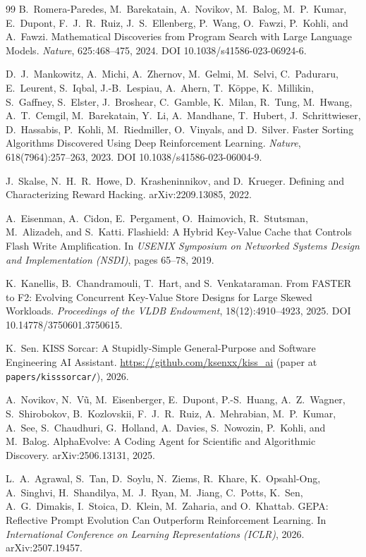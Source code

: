 \documentclass{article}
\begin{document}
\begin{thebibliography}{99}
 B.~Romera-Paredes, M.~Barekatain, A.~Novikov, M.~Balog, M.~P.~Kumar, E.~Dupont, F.~J.~R.~Ruiz, J.~S.~Ellenberg, P.~Wang, O.~Fawzi, P.~Kohli, and A.~Fawzi.
Mathematical Discoveries from Program Search with Large Language Models.
\emph{Nature}, 625:468--475, 2024. DOI 10.1038/s41586-023-06924-6.

 D.~J.~Mankowitz, A.~Michi, A.~Zhernov, M.~Gelmi, M.~Selvi, C.~Paduraru, E.~Leurent, S.~Iqbal, J.-B.~Lespiau, A.~Ahern, T.~K\"oppe, K.~Millikin, S.~Gaffney, S.~Elster, J.~Broshear, C.~Gamble, K.~Milan, R.~Tung, M.~Hwang, A.~T.~Cemgil, M.~Barekatain, Y.~Li, A.~Mandhane, T.~Hubert, J.~Schrittwieser, D.~Hassabis, P.~Kohli, M.~Riedmiller, O.~Vinyals, and D.~Silver.
Faster Sorting Algorithms Discovered Using Deep Reinforcement Learning.
\emph{Nature}, 618(7964):257--263, 2023. DOI 10.1038/s41586-023-06004-9.

 J.~Skalse, N.~H.~R.~Howe, D.~Krasheninnikov, and D.~Krueger.
Defining and Characterizing Reward Hacking.
arXiv:2209.13085, 2022.

 A.~Eisenman, A.~Cidon, E.~Pergament, O.~Haimovich, R.~Stutsman, M.~Alizadeh, and S.~Katti.
Flashield: A Hybrid Key-Value Cache that Controls Flash Write Amplification.
In \emph{USENIX Symposium on Networked Systems Design and Implementation (NSDI)}, pages 65--78, 2019.

 K.~Kanellis, B.~Chandramouli, T.~Hart, and S.~Venkataraman.
From FASTER to F2: Evolving Concurrent Key-Value Store Designs for Large Skewed Workloads.
\emph{Proceedings of the VLDB Endowment}, 18(12):4910--4923, 2025. DOI 10.14778/3750601.3750615.

 K.~Sen.
KISS Sorcar: A Stupidly-Simple General-Purpose and Software Engineering AI Assistant.
\url{https://github.com/ksenxx/kiss_ai} (paper at \texttt{papers/kisssorcar/}), 2026.

 A.~Novikov, N.~V\~u, M.~Eisenberger, E.~Dupont, P.-S.~Huang, A.~Z.~Wagner, S.~Shirobokov, B.~Kozlovskii, F.~J.~R.~Ruiz, A.~Mehrabian, M.~P.~Kumar, A.~See, S.~Chaudhuri, G.~Holland, A.~Davies, S.~Nowozin, P.~Kohli, and M.~Balog.
AlphaEvolve: A Coding Agent for Scientific and Algorithmic Discovery.
arXiv:2506.13131, 2025.

 L.~A.~Agrawal, S.~Tan, D.~Soylu, N.~Ziems, R.~Khare, K.~Opsahl-Ong, A.~Singhvi, H.~Shandilya, M.~J.~Ryan, M.~Jiang, C.~Potts, K.~Sen, A.~G.~Dimakis, I.~Stoica, D.~Klein, M.~Zaharia, and O.~Khattab.
GEPA: Reflective Prompt Evolution Can Outperform Reinforcement Learning.
In \emph{International Conference on Learning Representations (ICLR)}, 2026. arXiv:2507.19457.

\end{thebibliography}
\end{document}
